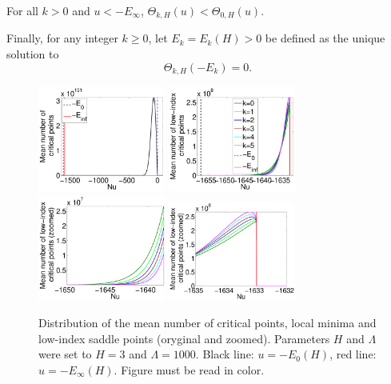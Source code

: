 \documentclass[twoside]{article}
\begin{document}
\begin{corollary}
For all $k > 0$ and $u < -E_{\infty}$, $\Theta_{k,H}(u) < \Theta_{0,H}(u)$.
\label{cor:Theta}
\end{corollary}
Finally, for any integer $k \geq 0$, let $E_k = E_k(H) > 0 $ be defined as the unique solution to 
\[\Theta_{k,H}(-E_k) = 0.
\]

\begin{figure}[htp!]
  \center
\includegraphics[width = 1.65in]{Distr_cp.pdf}
\includegraphics[width = 1.65in]{Distr_lm_sp_li.pdf} 
\includegraphics[width = 1.65in]{Distr_lm_sp_li_zoomed_left.pdf} 
\includegraphics[width = 1.65in]{Distr_lm_sp_li_zoomed_right.pdf} 
\vspace{-0.3in}
\caption{Distribution of the mean number of critical points, local minima and low-index saddle points (oryginal and zoomed). Parameters $H$ and $\Lambda$ were set to $H = 3$ and $\Lambda = 1000$. Black line: $u = -E_0(H)$, red line: $u = -E_{\infty}(H)$. Figure must be read in color.}
\label{fig:Distr_cp_lm_sp}
\vspace{-0.1in}
\end{figure}
\end{document}
